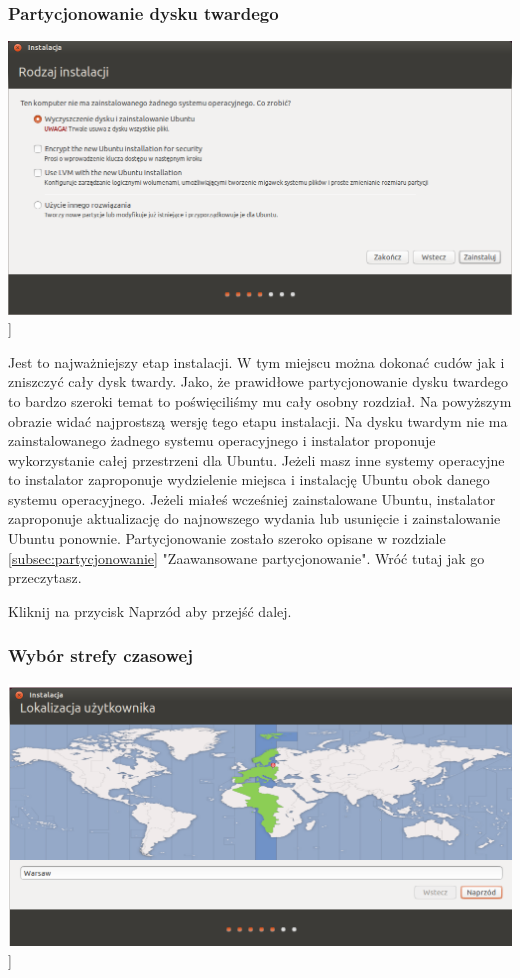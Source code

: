 \subsubsection{Partycjonowanie dysku twardego}
\begin{center}
        \includegraphics[width=\linewidth]{images/instalator_partycjonowanie_proste.png}]
\end{center}

Jest to najważniejszy etap instalacji. W tym miejscu można dokonać cudów jak i zniszczyć cały dysk twardy. Jako, że prawidłowe partycjonowanie dysku twardego to bardzo szeroki temat to poświęciliśmy mu cały osobny rozdział. Na powyższym obrazie widać najprostszą wersję tego etapu instalacji. Na dysku twardym nie ma zainstalowanego żadnego systemu operacyjnego i instalator proponuje wykorzystanie całej przestrzeni dla Ubuntu. Jeżeli masz inne systemy operacyjne to instalator zaproponuje wydzielenie miejsca i instalację Ubuntu obok danego systemu operacyjnego. Jeżeli miałeś wcześniej zainstalowane Ubuntu, instalator zaproponuje aktualizację do najnowszego wydania lub usunięcie i zainstalowanie Ubuntu ponownie.
Partycjonowanie zostało szeroko opisane w rozdziale \ref{subsec:partycjonowanie} "Zaawansowane partycjonowanie". Wróć tutaj jak go przeczytasz.
\begin{flushright}
Kliknij na przycisk \textcolor{ubuntu_orange}{Naprzód} aby przejść dalej.
\end{flushright}
\clearpage
\subsubsection{Wybór strefy czasowej}
\label{instalator_strefa_czasowa}
\begin{center}
        \includegraphics[width=\linewidth]{images/instalator_czas.png}]
\end{center}

